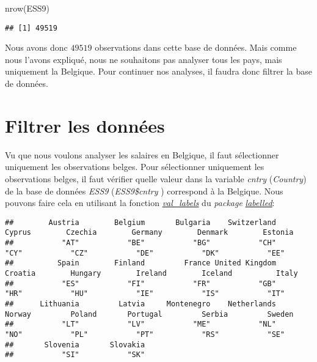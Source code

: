 \documentclass[
]{book}
\newenvironment{Shaded}{\begin{snugshade}}{\end{snugshade}}
\newcommand{\FunctionTok}[1]{\textcolor[rgb]{0.00,0.00,0.00}{#1}}
\newcommand{\NormalTok}[1]{#1}
\newcommand{\SpecialCharTok}[1]{\textcolor[rgb]{0.00,0.00,0.00}{#1}}
\begin{document}
\begin{Shaded}
\begin{Highlighting}[]
\FunctionTok{nrow}\NormalTok{(ESS9)}
\end{Highlighting}
\end{Shaded}

\begin{verbatim}
## [1] 49519
\end{verbatim}

Nous avons donc \(49519\) observations dans cette base de données. Mais comme nous l'avons expliqué, nous ne souhaitons pas analyser tous les pays, mais uniquement la Belgique. Pour continuer nos analyses, il faudra donc filtrer la base de données.

\hypertarget{filtrer-les-donnuxe9es}{%
\section{Filtrer les données}\label{filtrer-les-donnuxe9es}}

Vu que nous voulons analyser les salaires en Belgique, il faut sélectionner uniquement les observations belges. Pour sélectionner uniquement les observations belges, il faut vérifier quelle valeur dans la variable \emph{cntry} (\emph{Country}) de la base de données \emph{ESS9} (\emph{ESS9\$cntry} ) correspond à la Belgique. Nous pouvons faire cela en utilisant la fonction \href{https://www.rdocumentation.org/packages/labelled/versions/2.10.0/topics/val_labels}{\emph{val\_labels}} du \emph{package} \href{https://cran.r-project.org/web/packages/labelled/vignettes/intro_labelled.html}{\emph{labelled}}:

\begin{Shaded}
\end{Shaded}

\begin{verbatim}
##        Austria        Belgium       Bulgaria    Switzerland         Cyprus        Czechia        Germany        Denmark        Estonia 
##           "AT"           "BE"           "BG"           "CH"           "CY"           "CZ"           "DE"           "DK"           "EE" 
##          Spain        Finland         France United Kingdom        Croatia        Hungary        Ireland        Iceland          Italy 
##           "ES"           "FI"           "FR"           "GB"           "HR"           "HU"           "IE"           "IS"           "IT" 
##      Lithuania         Latvia     Montenegro    Netherlands         Norway         Poland       Portugal         Serbia         Sweden 
##           "LT"           "LV"           "ME"           "NL"           "NO"           "PL"           "PT"           "RS"           "SE" 
##       Slovenia       Slovakia 
##           "SI"           "SK"
\end{verbatim}
\end{document}

